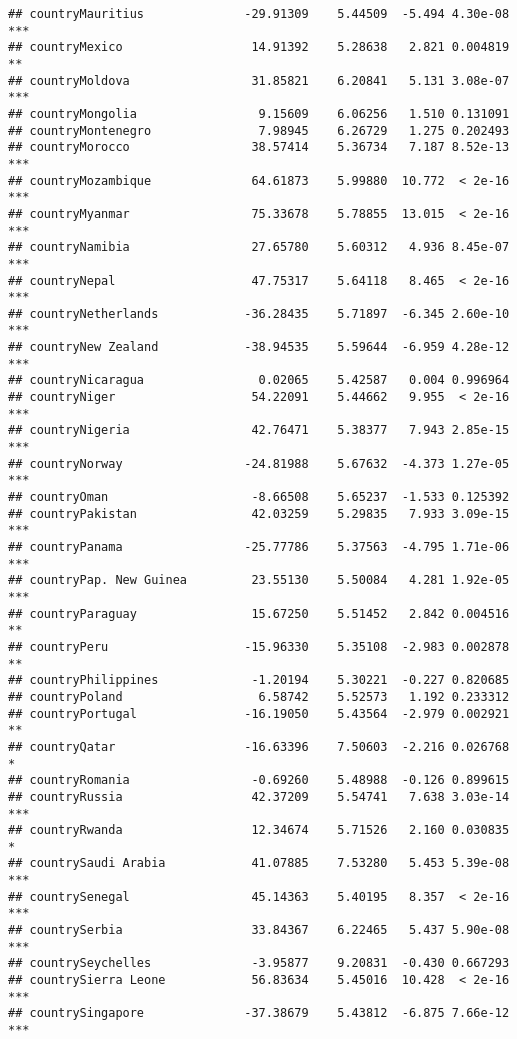 \documentclass[
  11pt,
]{article}
\begin{document}
\begin{verbatim}
## countryMauritius              -29.91309    5.44509  -5.494 4.30e-08 ***
## countryMexico                  14.91392    5.28638   2.821 0.004819 ** 
## countryMoldova                 31.85821    6.20841   5.131 3.08e-07 ***
## countryMongolia                 9.15609    6.06256   1.510 0.131091    
## countryMontenegro               7.98945    6.26729   1.275 0.202493    
## countryMorocco                 38.57414    5.36734   7.187 8.52e-13 ***
## countryMozambique              64.61873    5.99880  10.772  < 2e-16 ***
## countryMyanmar                 75.33678    5.78855  13.015  < 2e-16 ***
## countryNamibia                 27.65780    5.60312   4.936 8.45e-07 ***
## countryNepal                   47.75317    5.64118   8.465  < 2e-16 ***
## countryNetherlands            -36.28435    5.71897  -6.345 2.60e-10 ***
## countryNew Zealand            -38.94535    5.59644  -6.959 4.28e-12 ***
## countryNicaragua                0.02065    5.42587   0.004 0.996964    
## countryNiger                   54.22091    5.44662   9.955  < 2e-16 ***
## countryNigeria                 42.76471    5.38377   7.943 2.85e-15 ***
## countryNorway                 -24.81988    5.67632  -4.373 1.27e-05 ***
## countryOman                    -8.66508    5.65237  -1.533 0.125392    
## countryPakistan                42.03259    5.29835   7.933 3.09e-15 ***
## countryPanama                 -25.77786    5.37563  -4.795 1.71e-06 ***
## countryPap. New Guinea         23.55130    5.50084   4.281 1.92e-05 ***
## countryParaguay                15.67250    5.51452   2.842 0.004516 ** 
## countryPeru                   -15.96330    5.35108  -2.983 0.002878 ** 
## countryPhilippines             -1.20194    5.30221  -0.227 0.820685    
## countryPoland                   6.58742    5.52573   1.192 0.233312    
## countryPortugal               -16.19050    5.43564  -2.979 0.002921 ** 
## countryQatar                  -16.63396    7.50603  -2.216 0.026768 *  
## countryRomania                 -0.69260    5.48988  -0.126 0.899615    
## countryRussia                  42.37209    5.54741   7.638 3.03e-14 ***
## countryRwanda                  12.34674    5.71526   2.160 0.030835 *  
## countrySaudi Arabia            41.07885    7.53280   5.453 5.39e-08 ***
## countrySenegal                 45.14363    5.40195   8.357  < 2e-16 ***
## countrySerbia                  33.84367    6.22465   5.437 5.90e-08 ***
## countrySeychelles              -3.95877    9.20831  -0.430 0.667293    
## countrySierra Leone            56.83634    5.45016  10.428  < 2e-16 ***
## countrySingapore              -37.38679    5.43812  -6.875 7.66e-12 ***

\end{verbatim}
\end{document}
